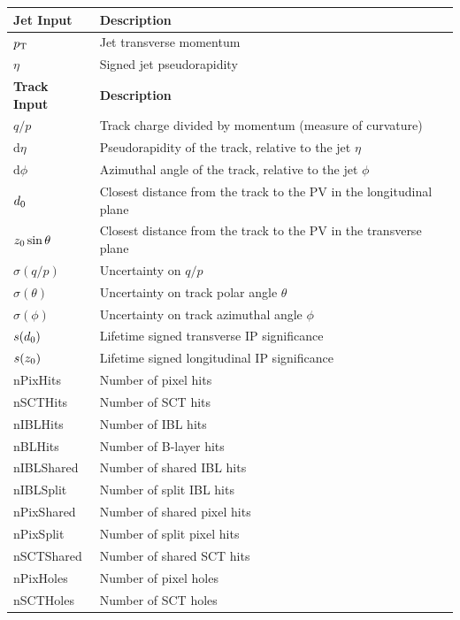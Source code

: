\begin{table}[!htbp]
  \footnotesize\centering
  \setlength{\tabcolsep}{0.5em} %
  \begin{tabular}{ll}
    \toprule\hline 
    \textbf{Jet Input} & \textbf{Description} \\
    \hline
    $p_{\text{T}}$ & Jet transverse momentum \\
    $\eta$ & Signed jet pseudorapidity \\
    \toprule
    \textbf{Track Input} & \textbf{Description} \\
    \hline
    $q/p$ & Track charge divided by momentum (measure of curvature) \\
    $\mathrm{d}\eta$ & Pseudorapidity of the track, relative to the jet $\eta$ \\
    $\mathrm{d}\phi$  & Azimuthal angle of the track, relative to the jet $\phi$ \\
    $d_{0}$  & Closest distance from the track to the PV in the longitudinal plane \\
    $z_{0}\sin\theta$  & Closest distance from the track to the PV in the transverse plane \\
    $\sigma(q/p)$ & Uncertainty on $q/p$ \\
    $\sigma(\theta)$ & Uncertainty on track polar angle $\theta$ \\
    $\sigma(\phi)$  & Uncertainty on track azimuthal angle $\phi$ \\
    $s(d_0)$  & Lifetime signed transverse IP significance \\
    $s(z_0)$  & Lifetime signed longitudinal IP significance \\
    nPixHits   & Number of pixel hits \\
    nSCTHits   & Number of SCT hits \\
    nIBLHits   & Number of IBL hits \\
    nBLHits    & Number of B-layer hits \\
    nIBLShared & Number of shared IBL hits \\
    nIBLSplit  & Number of split IBL hits \\
    nPixShared & Number of shared pixel hits \\
    nPixSplit  & Number of split pixel hits \\
    nSCTShared & Number of shared SCT hits \\
    nPixHoles  & Number of pixel holes \\
    nSCTHoles  & Number of SCT holes \\

\end{tabular}
\end{table}
